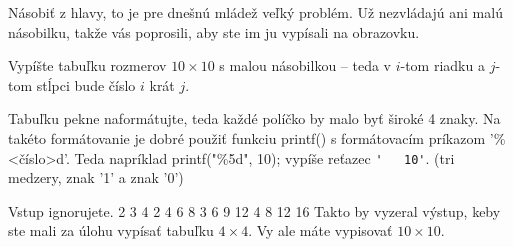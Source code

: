 




Násobiť z hlavy, to je pre dnešnú mládež veľký problém.
Už nezvládajú ani malú násobilku, takže vás poprosili, aby ste im
ju vypísali na obrazovku.


Vypíšte tabuľku rozmerov $10 \times 10$ s malou násobilkou -- teda v $i$-tom riadku
a $j$-tom stĺpci bude číslo $i$ krát $j$.

Tabuľku pekne naformátujte, teda každé políčko by malo byť široké 4 znaky.
Na takéto formátovanie je dobré použiť funkciu printf() s formátovacím 
príkazom '\%<číslo>d'. Teda napríklad printf("\%5d", 10); vypíše reťazec \verb!'   10'!.
(tri medzery, znak '1' a znak '0')


\vstup
Vstup ignorujete.
   2   3   4
   2   4   6   8
   3   6   9  12
   4   8  12  16
\komentar
Takto by vyzeral výstup, keby ste mali za úlohu vypísať tabuľku $4\times 4$.
Vy ale máte vypisovať $10\times 10$.
\koniec


